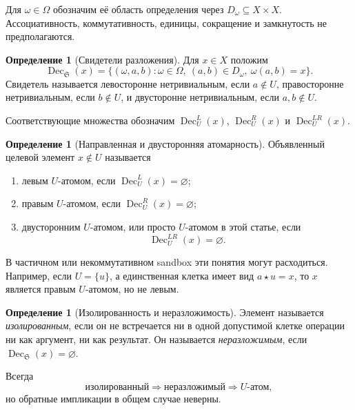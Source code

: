 \documentclass[11pt]{article}
\theoremstyle{definition}
\newtheorem{definition}[theorem]{Определение}
\theoremstyle{remark}
\newcommand{\Sbx}{\mathfrak S}
\newcommand{\Dec}{\operatorname{Dec}}
\begin{document}
Для \(\omega\in\Omega\) обозначим её область определения через \(D_\omega\subseteq X\times X\). Ассоциативность, коммутативность, единицы, сокращение и замкнутость не предполагаются.

\begin{definition}[Свидетели разложения]
Для \(x\in X\) положим
\begin{equation}
\Dec_{\Sbx}(x)=\{(\omega,a,b):\omega\in\Omega,\ (a,b)\in D_\omega,\ \omega(a,b)=x\}.
\label{eq:dec}
\end{equation}
Свидетель называется левосторонне нетривиальным, если \(a\notin U\), правосторонне нетривиальным, если \(b\notin U\), и двусторонне нетривиальным, если \(a,b\notin U\).
\end{definition}

Соответствующие множества обозначим \(\Dec_U^L(x)\), \(\Dec_U^R(x)\) и \(\Dec_U^{LR}(x)\).

\begin{definition}[Направленная и двусторонняя атомарность]
Объявленный целевой элемент \(x\notin U\) называется
\begin{enumerate}[label=(\roman*)]
\item левым \(U\)-атомом, если \(\Dec_U^L(x)=\varnothing\);
\item правым \(U\)-атомом, если \(\Dec_U^R(x)=\varnothing\);
\item двусторонним \(U\)-атомом, или просто \(U\)-атомом в этой статье, если
\begin{equation}
\Dec_U^{LR}(x)=\varnothing.
\label{eq:atomdef}
\end{equation}
\end{enumerate}
\end{definition}

В частичном или некоммутативном sandbox эти понятия могут расходиться. Например, если \(U=\{u\}\), а единственная клетка имеет вид \(a\star u=x\), то \(x\) является правым \(U\)-атомом, но не левым.

\begin{definition}[Изолированность и неразложимость]
Элемент называется \emph{изолированным}, если он не встречается ни в одной допустимой клетке операции ни как аргумент, ни как результат. Он называется \emph{неразложимым}, если \(\Dec_{\Sbx}(x)=\varnothing\).
\end{definition}

Всегда
\[
\text{изолированный}\Longrightarrow\text{неразложимый}\Longrightarrow U\text{-атом},
\]
но обратные импликации в общем случае неверны.
\end{document}
